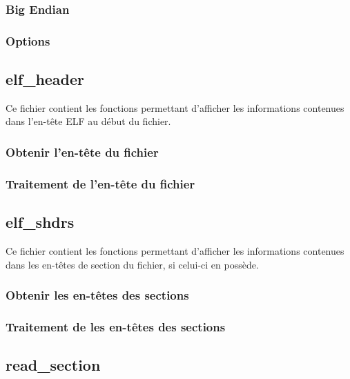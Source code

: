 \documentclass[a4paper]{article} %
\begin{document}
\subsubsection*{Big Endian}

\subsubsection*{Options}
\label{sec:options}


\subsection{elf\_header}
\label{sec:elfheader}
Ce fichier contient les fonctions permettant d'afficher les informations contenues dans l'en-tête ELF au début du fichier.

\subsubsection*{Obtenir l'en-tête du fichier}

\subsubsection*{Traitement de l'en-tête du fichier}


\subsection{elf\_shdrs}
\label{sec:sectionheader}
Ce fichier contient les fonctions permettant d'afficher les informations contenues dans les en-têtes de section du fichier, si celui-ci en possède.

\subsubsection*{Obtenir les en-têtes des sections}

\subsubsection*{Traitement de les en-têtes des sections}


\subsection{read\_section}
\label{sec:section}
\end{document}
